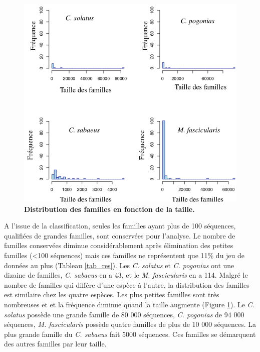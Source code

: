\documentclass[12pt,a4paper]{article}
\begin{document}
		\begin{figure}
			\center
			\includegraphics[scale=0.45]{img/distribution_familles.png}
			\caption{\textbf{Distribution des familles en fonction de la taille.}}
			\label{dist_fam} 
		\end{figure}

	A l'issue de la classification, seules les familles ayant plus de 100 séquences, qualifiées de grandes familles, sont conservées pour l'analyse. Le nombre de familles conservées diminue considérablement après élimination des petites familles (<100 séquences) mais ces familles ne représentent que 11\% du jeu de données au plus (Tableau \ref{tab_res}). Les \textit{C. solatus} et \textit{C. pogonias} ont une dizaine de familles, \textit{C. sabaeus} en a 43, et le \textit{M. fascicularis} en a 114. Malgré le nombre de familles qui diffère d'une espèce à l'autre, la distribution des familles est similaire chez les quatre espèces. Les plus petites familles sont très nombreuses et et la fréquence diminue quand la taille augmente (Figure \ref{dist_fam}). Le \textit{C. solatus} possède une grande famille de 80 000 séquences, \textit{C. pogonias} de 94 000 séquences, \textit{M. fascicularis} possède quatre familles de plus de 10 000 séquences. La plus grande famille du \textit{C. sabaeus} fait 5000 séquences. Ces familles se démarquent des autres familles par leur taille.
\end{document}
